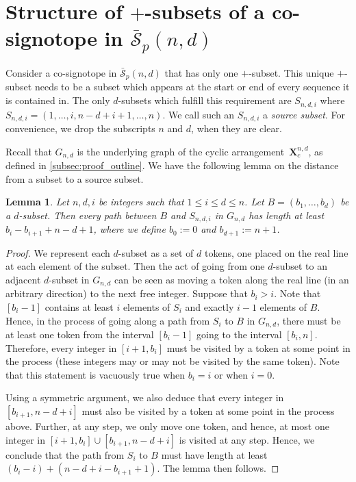 \documentclass[a4paper,11pt]{amsart}
\newtheorem{lemma}[theorem]{Lemma}
\newcommand{\calS}{\mathcal{S}}
\newcommand{\defi}[1]{\textcolor{defblue}{\emph{#1}}}
\begin{document}
\section{Structure of $+$-subsets of a co-signotope in $\bar{\calS}_p(n,d)$}
\label{sec:plus_subsets}
Consider a co-signotope in $\bar{\calS}_p(n,d)$ that has only one $+$-subset.
This unique $+$-subset needs to be a subset which appears at the start or end of every sequence it is contained in. 
The only $d$-subsets which fulfill this requirement are $S_{n,d,i}$ where $S_{n,d,i} = (1, \ldots, i, n-d+i+1, \ldots, n)$.
We call such an $S_{n,d,i}$ a \defi{source subset}.
For convenience, we drop the subscripts $n$ and $d$, when they are clear.

Recall that $G_{n,d}$ is the underlying graph of the cyclic arrangement~$\mathbf{X}^{n,d}_c$, as defined in \cref{subsec:proof_outline}.
We have the following lemma on the distance from a subset to a source subset.

\begin{lemma}
\label{lem:dist_to_source}
	Let $n,d,i$ be integers such that $1 \leq i \leq d \leq n$.
	Let $B = (b_1, \dots, b_d)$ be a $d$-subset.
	Then every path between $B$ and $S_{n,d,i}$ in $G_{n,d}$ has length at least $b_i-b_{i+1}+n-d+1$, where we define $b_0 := 0$ and $b_{d+1} := n+1$.
\end{lemma}

\begin{proof}
    We represent each $d$-subset as a set of $d$ tokens, one placed on the real line at each element of the subset.
    Then the act of going from one $d$-subset to an adjacent $d$-subset in $G_{n,d}$ can be seen as moving a token along the real line (in an arbitrary direction) to the next free integer. 
	Suppose that $b_i > i$.
	Note that $[b_i-1]$ contains at least $i$ elements of $S_i$ and exactly $i-1$ elements of $B$.
	Hence, in the process of going along a path from $S_i$ to $B$ in $G_{n,d}$, there must be at least one token from the interval $[b_i-1]$ going to the interval $[b_i,n]$. 
	Therefore, every integer in $[i+1,b_i]$ must be visited by a token at some point in the process (these integers may or may not be visited by the same token).
	Note that this statement is vacuously true when $b_i = i$ or when $i=0$.
	
	Using a symmetric argument, we also deduce that every integer in $[b_{i+1},n-d+i]$ must also be visited by a token at some point in the process above.
	Further, at any step, we only move one token, and hence, at most one integer in $[i+1,b_i] \cup [b_{i+1},n-d+i]$ is visited at any step.
	Hence, we conclude that the path from $S_i$ to $B$ must have length at least $(b_i-i) + (n-d+i-b_{i+1}+1)$.
	The lemma then follows.
\end{proof}
\end{document}
